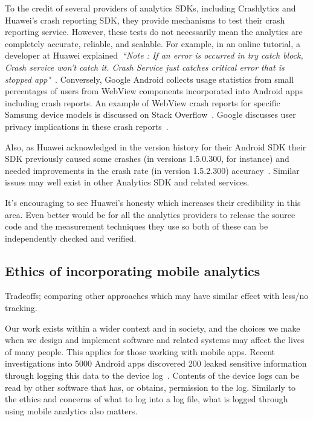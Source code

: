 To the credit of several providers of analytics SDKs, including Crashlytics and Huawei's crash reporting SDK, they provide mechanisms to test their crash reporting service. However, these tests do not necessarily mean the analytics are completely accurate, reliable, and scalable. For example, in an online tutorial, a developer at Huawei explained~\emph{``Note : If an error is occurred in try catch block, Crash service won’t catch it. Crash Service just catches critical error that is stopped app"}~. Conversely, Google Android collects usage statistics from small percentages of users from WebView components incorporated into Android apps including crash reports. An example of WebView crash reports for specific Samsung device models is discussed on Stack Overflow~. Google discusses user privacy implications in these crash reports~.

Also, as Huawei acknowledged in the version history for their Android SDK their SDK previously caused some crashes (in versions 1.5.0.300, for instance) and needed improvements in the crash rate (in version 1.5.2.300) accuracy~. Similar issues may well exist in other Analytics SDK and related services. 

It's encouraging to see Huawei's honesty which increases their credibility in this area. Even better would be for all the analytics providers to release the source code and the measurement techniques they use so both of these can be independently checked and verified.


\subsection{Ethics of incorporating mobile analytics}
Tradeoffs; comparing other approaches which may have similar effect with less/no tracking.

Our work exists within a wider context and in society, and the choices we make when we design and implement software and related systems may affect the lives of many people. This applies for those working with mobile apps. Recent investigations into 5000 Android apps discovered 200 leaked sensitive information through logging this data to the device log~. Contents of the device logs can be read by other software that has, or obtains, permission to the log. 
%
Similarly to the ethics and concerns of what to log into a log file, what is logged through using mobile analytics also matters.

